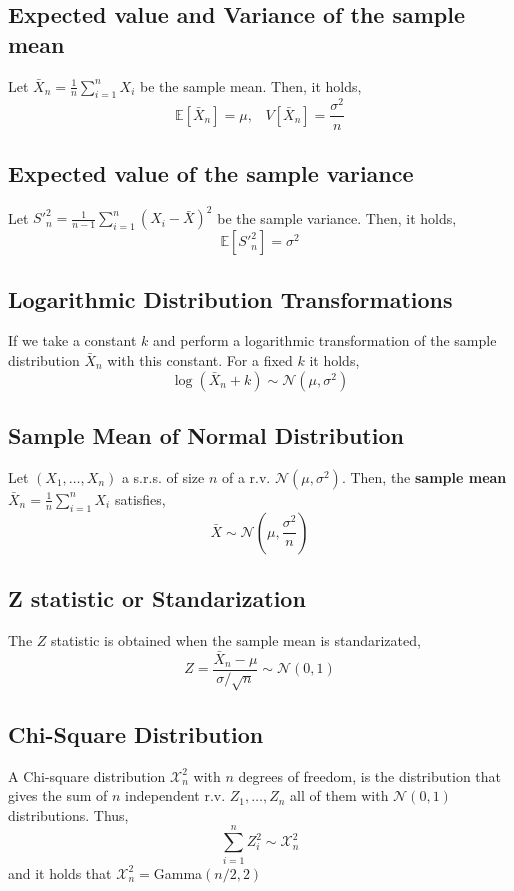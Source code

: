 \subsection{Expected value and Variance of the sample mean}
Let $\bar{X}_n = \frac{1}{n}\sum_{i=1}^n X_i$ be the sample mean. Then, it
holds,
\[ \mathbb{E}[\bar{X}_n] = \mu,\;\;\; V[\bar{X}_n] = \frac{\sigma^2}{n} \]

\subsection{Expected value of the sample variance}
Let $S'^2_n = \frac{1}{n-1}\sum_{i=1}^{n} (X_i-\bar{X})^2 $ be the sample
variance. Then, it holds,
\[ \mathbb{E}[S'^2_n] = \sigma^2 \]

\subsection{Logarithmic Distribution Transformations}
If we take a constant $k$ and perform a logarithmic transformation of the sample
distribution $\bar{X}_n$ with this constant. For a fixed $k$ it holds,
\[ \log(\bar{X}_n + k) \sim \mathcal{N}(\mu, \sigma^2) \]

\subsection{Sample Mean of Normal Distribution}
Let $(X_1,\dots,X_n)$ a s.r.s. of size $n$ of a r.v.
$\mathcal{N}(\mu,\sigma^2)$. Then, the \textbf{sample mean} $\bar{X}_n =
\frac{1}{n}\sum_{i=1}^n X_i$ satisfies,
\[ \bar{X} \sim \mathcal{N}(\mu,\frac{\sigma^2}{n}) \]

\subsection{Z statistic or Standarization}
The $Z$ statistic is obtained when the sample mean is standarizated,
\[ Z = \frac{\bar{X}_n - \mu}{\sigma / \sqrt{n}} \sim \mathcal{N}(0,1) \]

\subsection{Chi-Square Distribution}
A Chi-square distribution $\mathcal{X}_n^2$ with $n$ degrees of freedom, is the
distribution that gives the sum of $n$ independent r.v. $Z_1,\dots,Z_n$ all of
them with $\mathcal{N}(0,1)$ distributions. Thus,
\[ \sum_{i=1}^n Z_i^2 \sim \mathcal{X}_n^2 \] and it holds that $\mathcal{X}^2_n
= $Gamma$(n/2,2)$

